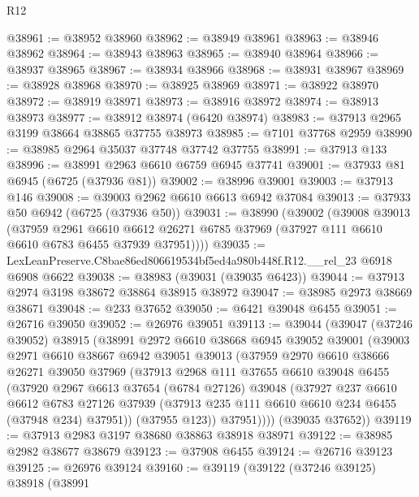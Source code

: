 \begin{lexlean}{R12}
\begin{coremodule}
@38961 := @38952 @38960
@38962 := @38949 @38961
@38963 := @38946 @38962
@38964 := @38943 @38963
@38965 := @38940 @38964
@38966 := @38937 @38965
@38967 := @38934 @38966
@38968 := @38931 @38967
@38969 := @38928 @38968
@38970 := @38925 @38969
@38971 := @38922 @38970
@38972 := @38919 @38971
@38973 := @38916 @38972
@38974 := @38913 @38973
@38977 := @38912 @38974 (@6420 @38974)
@38983 := @37913 @2965 @3199 @38664 @38865 @37755 @38973
@38985 := @7101 @37768 @2959
@38990 := @38985 @2964 @35037 @37748 @37742 @37755
@38991 := @37913 @133
@38996 := @38991 @2963 @6610 @6759 @6945 @37741
@39001 := @37933 @81 @6945 (@6725 (@37936 @81))
@39002 := @38996 @39001
@39003 := @37913 @146
@39008 := @39003 @2962 @6610 @6613 @6942 @37084
@39013 := @37933 @50 @6942 (@6725 (@37936 @50))
@39031 := @38990
    (@39002
      (@39008
        @39013
        (@37959
          @2961
          @6610
          @6612
          @26271
          @6785
          @37969
          (@37927 @111 @6610 @6610 @6783 @6455 @37939 @37951))))
@39035 := LexLeanPreserve.C8bae86ed806619534bf5ed4a980b448f.R12.__rel_23 @6918 @6908 @6622
@39038 := @38983 (@39031 (@39035 @6423))
@39044 := @37913 @2974 @3198 @38672 @38864 @38915 @38972
@39047 := @38985 @2973 @38669 @38671
@39048 := @233 @37652
@39050 := @6421 @39048 @6455
@39051 := @26716 @39050
@39052 := @26976 @39051
@39113 := @39044
    (@39047
      (@37246 @39052)
      @38915
      (@38991
        @2972
        @6610
        @38668
        @6945
        @39052
        @39001
        (@39003
          @2971
          @6610
          @38667
          @6942
          @39051
          @39013
          (@37959
            @2970
            @6610
            @38666
            @26271
            @39050
            @37969
            (@37913
              @2968
              @111
              @37655
              @6610
              @39048
              @6455
              (@37920
                @2967
                @6613
                @37654
                (@6784 @27126)
                @39048
                (@37927
                  @237
                  @6610
                  @6612
                  @6783
                  @27126
                  @37939
                  (@37913 @235 @111 @6610 @6610 @234 @6455 (@37948 @234) @37951))
                (@37955 @123))
              @37951))))
      (@39035 @37652))
@39119 := @37913 @2983 @3197 @38680 @38863 @38918 @38971
@39122 := @38985 @2982 @38677 @38679
@39123 := @37908 @6455
@39124 := @26716 @39123
@39125 := @26976 @39124
@39160 := @39119
    (@39122
      (@37246 @39125)
      @38918
      (@38991

\end{coremodule}
\end{lexlean}
